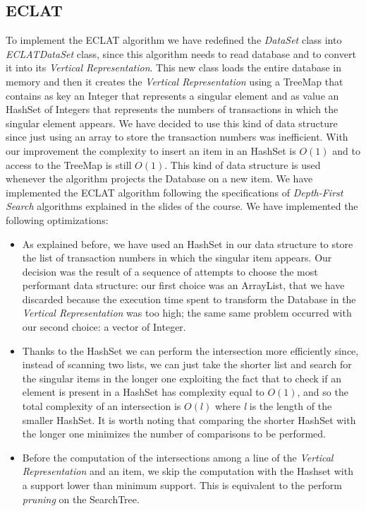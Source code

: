 \documentclass[11pt, a4paper]{article}
\begin{document}
		\subsection{ECLAT}
			To implement the ECLAT algorithm we have redefined the \textit{DataSet} class into \textit{ECLATDataSet} class, since this algorithm needs to read database and to convert it into its \textit{Vertical Representation}.
			This new class loads the entire database in memory and then it creates the \textit{Vertical Representation} using a TreeMap that contains as key an Integer that represents a singular element and as value an HashSet of Integers that represents the numbers of transactions in which the singular element appears.
			We have decided to use this kind of data structure since just using an array to store the transaction numbers was inefficient. With our improvement the complexity to insert an item in an HashSet is $O(1)$ and to access to the TreeMap is still $O(1)$.\newline
			This kind of data structure is used whenever the algorithm projects the Database on a new item.
			We have implemented the ECLAT algorithm following the specifications of \textit{Depth-First Search} algorithms explained in the slides of the course.
			\newline \newline
			We have implemented the following optimizations:
			\begin{itemize}
				\item As explained before, we have used an HashSet in our data structure to store the list of transaction numbers in which the singular item appears. Our decision was the result of a sequence of attempts to choose the most performant data structure: our first choice was an ArrayList, that we have discarded because the execution time spent to transform the Database in the \textit{Vertical Representation} was too high; the same same problem occurred with our second choice: a vector of Integer.
				\item Thanks to the HashSet we can perform the intersection more efficiently since, instead of scanning two lists, we can just take the shorter list and search for the singular items in the longer one exploiting the fact that to check if an element is present in a HashSet has complexity equal to $O(1)$, and so the total complexity of an intersection is $O(l)$ where \textit{l} is the length of the smaller HashSet.
				It is worth noting that comparing the shorter HashSet with the longer one minimizes the number of comparisons to be performed.
				\item Before the computation of the intersections among a line of the \textit{Vertical Representation} and an item, we skip the computation with the Hashset with a support lower than minimum support. This is equivalent to the perform \textit{pruning} on the SearchTree.
			
			\end{itemize}
			
\end{document}
